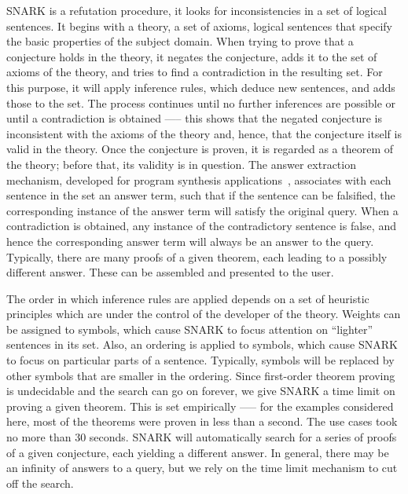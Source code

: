 SNARK is a refutation procedure, \ie it looks for inconsistencies in a set of logical sentences. It begins with a theory, a set of axioms, \ie logical sentences that specify the basic properties of the subject domain. 
When trying to prove that a conjecture holds in the theory, it negates the conjecture, adds it to the set of axioms of the theory, and tries to find a contradiction in the resulting set. 
For this purpose, it will apply inference rules, which deduce new sentences, and adds those to the set. The process continues until no further inferences are possible or until a contradiction is obtained \-—-- this shows that the negated conjecture is inconsistent with the axioms of the theory and, hence, that the conjecture itself is valid in the theory. 
Once the conjecture is proven, it is regarded as a theorem of the theory; before that, its validity is in question.
The answer extraction mechanism, developed for program synthesis applications~\cite{Manna:1980:DAP:357084.357090}, associates with each sentence in the set an answer term, such that if the sentence can be falsified, the corresponding instance of the answer term will satisfy the original query. 
When a contradiction is obtained, any instance of the contradictory sentence is false, and hence the corresponding answer term will always  be an answer to the query. 
Typically, there are many proofs of a given theorem, each leading to a possibly different answer. 
These can be assembled and presented to the user.

The order in which inference rules are applied depends on a set of heuristic principles which are under the control of the developer of the theory. 
Weights can be assigned to symbols, which cause SNARK to focus attention on “lighter” sentences in its set. 
Also, an ordering is applied to symbols, which cause SNARK to focus on particular parts of a sentence. 
Typically, symbols will be replaced by other symbols that are smaller in the ordering. 
Since first-order theorem proving is undecidable and the search can go on forever, we give SNARK a time limit on proving a given theorem. 
This is set empirically \-—-- for the examples considered here, most of the theorems were proven in less than a second. The use cases took no more than 30 seconds.
SNARK will automatically search for a series of proofs of a given conjecture, each yielding a different answer.
In general, there may be an infinity of answers to a query, but we rely on the time limit mechanism to cut off the search.


